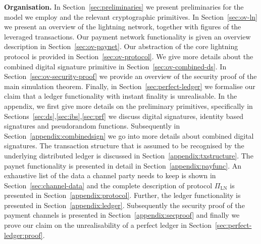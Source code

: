 \noindent \textbf{Organisation.} In Section~\ref{sec:preliminaries} we present
preliminaries for the model we employ and the relevant cryptographic primitives.
In Section~\ref{sec:ov-ln} we present an overview of the lightning network,
together with figures of the leveraged transactions. Our payment network
functionality is given an overview description in Section~\ref{sec:ov-paynet}.
Our abstraction of the core lightning protocol is provided in
Section~\ref{sec:ov-protocol}. We give more details about the combined digital
signature primitive in Section~\ref{sec:ov-combined-ds}. In
Section~\ref{sec:ov-security-proof} we provide an overview of the security
proof of the main simulation theorem. Finally, in
Section~\ref{sec:perfect-ledger} we formalise our claim that a ledger
functionality with instant finality is unrealisable. In the appendix, we first
give more details on the preliminary primitives, specifically in
Sections~\ref{sec:ds},\ref{sec:ibs},\ref{sec:prf} we discuss digital signatures,
identity based signatures and pseudorandom functions. Subsequently in
Section~\ref{appendix:combinedsign} we go into more details about combined
digital signatures. The transaction structure that is assumed to be recognised
by the underlying distributed ledger is discussed in
Section~\ref{appendix:txstructure}. The paynet functionality is presented in
detail in Section~\ref{appendix:payfunc}. An exhaustive list of the data a
channel party needs to keep is shown in Section~\ref{sec:channel-data} and the
complete description of protocol $\Pi_{\mathrm{LN}}$ is presented in
Section~\ref{appendix:protocol}. Further, the ledger functionality is presented
in Section~\ref{appendix:ledger}. Subsequently the security proof of the payment
channels is presented in Section~\ref{appendix:secproof} and finally we prove
our claim on the unrealisability of a perfect ledger in
Section~\ref{sec:perfect-ledger:proof}.
